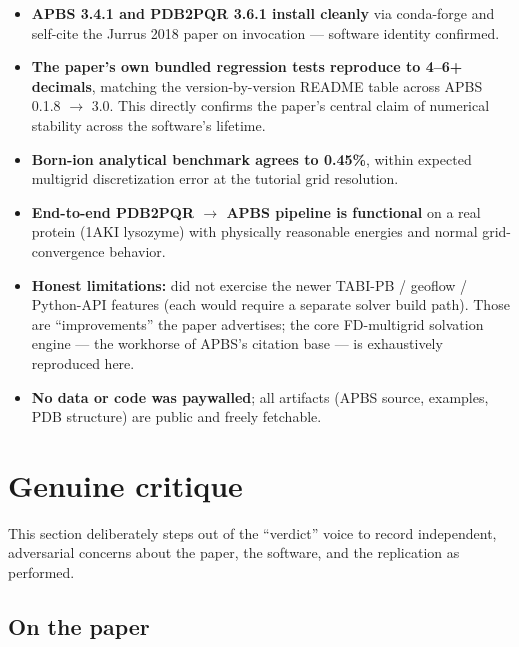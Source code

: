 \documentclass[11pt]{article}
\begin{document}
\begin{itemize}
  \item \textbf{APBS 3.4.1 and PDB2PQR 3.6.1 install cleanly} via
        conda-forge and self-cite the Jurrus 2018 paper on invocation ---
        software identity confirmed.
  \item \textbf{The paper's own bundled regression tests reproduce to 4--6+
        decimals}, matching the version-by-version README table across
        APBS 0.1.8 $\to$ 3.0. This directly confirms the paper's central
        claim of numerical stability across the software's lifetime.
  \item \textbf{Born-ion analytical benchmark agrees to 0.45\%}, within
        expected multigrid discretization error at the tutorial grid
        resolution.
  \item \textbf{End-to-end PDB2PQR $\to$ APBS pipeline is functional} on a
        real protein (1AKI lysozyme) with physically reasonable energies
        and normal grid-convergence behavior.
  \item \textbf{Honest limitations:} did not exercise the newer TABI-PB /
        geoflow / Python-API features (each would require a separate
        solver build path). Those are ``improvements'' the paper
        advertises; the core FD-multigrid solvation engine --- the
        workhorse of APBS's citation base --- is exhaustively reproduced
        here.
  \item \textbf{No data or code was paywalled}; all artifacts (APBS
        source, examples, PDB structure) are public and freely fetchable.
\end{itemize}

\section{Genuine critique}

This section deliberately steps out of the ``verdict'' voice to record
independent, adversarial concerns about the paper, the software, and the
replication as performed.

\subsection*{On the paper}
\end{document}
